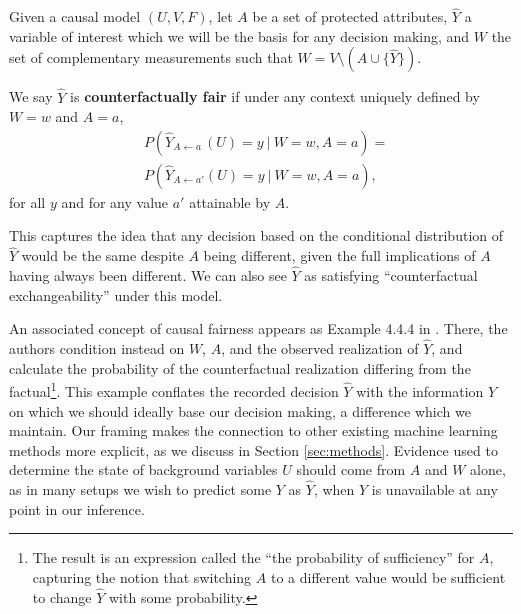 Given a causal model $(U, V, F)$, let $A$ be a set of protected
attributes, $\hat Y$ a variable of interest which we will be the basis for
any decision making, and $W$ the set of complementary measurements such that
$W= V \setminus ( A \cup \{\hat Y\})$.
\begin{define}
We say $\hat Y$ is {\bf counterfactually fair}
if under any context uniquely defined by $W = w$ and $A = a$,
  \label{eq:cf_definition}
\begin{align}
  &P(\hat Y_{A \leftarrow a\ }(U) = y\ |\ W = w, A = a)  =\nonumber\\ 
  &P(\hat Y_{A \leftarrow a'}(U) = y\ |\ W = w, A = a), 
\end{align}
for all $y$ and for any value $a'$ attainable by $A$.
\end{define}
This captures the idea that any decision based on the
conditional distribution of $\hat Y$ would be the same despite  $A$ being
different, given the full implications of $A$ having always been different.
We can also see $\hat Y$ as satisfying ``counterfactual exchangeability''
under this model.

An associated concept of causal fairness appears as Example 4.4.4 in
\citet{pearl:16}. There, the authors condition instead on $W$, $A$,
and the observed realization of $\hat Y$, and calculate the
probability of the counterfactual realization differing from the
factual\footnote{The result is an expression called the ``the
  probability of sufficiency'' for $A$, capturing the notion that
  switching $A$ to a different value would be sufficient to change
  $\hat Y$ with some probability.}. This example conflates the
recorded decision $\hat Y$ with the information $Y$ on which we should
ideally base our decision making, a difference which we maintain.  Our
framing makes the connection to other existing machine learning
methods more explicit, as we discuss in Section \ref{sec:methods}.
Evidence used to determine the state of background variables $U$
should come from $A$ and $W$ alone, as in many setups we wish to
predict some $Y$ as $\hat Y$, when $Y$ is unavailable at any point in
our inference.

